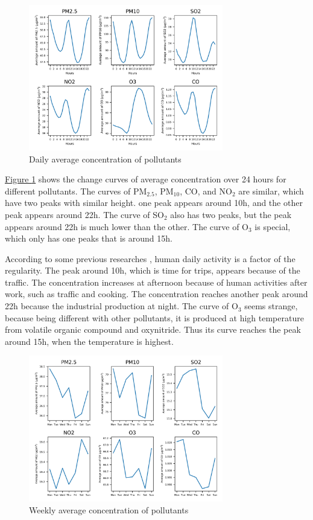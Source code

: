 \documentclass[letterpaper]{article}
\begin{document}
\begin{CJK*}{UTF8}{gkai}
\begin{figure}[h]
  \includegraphics[width = 8.5cm]{dailyavg_pltn.png}
  \caption{Daily average concentration of pollutants}
  \label{figure:2}
\end{figure}

\hyperref[figure:2]{Figure \ref*{figure:2}} shows the change curves of average concentration over 24 hours for different pollutants. The curves of PM$_{2.5}$, PM$_{10}$, CO, and NO$_{2}$ are similar, which have two peaks with similar height. one peak appears around 10h, and the other peak appears around 22h. The curve of SO$_{2}$ also has two peaks, but the peak appears around 22h is much lower than the other. The curve of O$_{3}$ is special, which only has one peaks that is around 15h.

According to some previous researches , human daily activity is a factor of the regularity. The peak around 10h, which is time for trips, appears because of the traffic. The concentration increases at afternoon because of human activities after work, such as traffic and cooking. The concentration reaches another peak around 22h because the industrial production at night. The curve of O$_{3}$ seems strange, because being different with other pollutants, it is produced at high temperature from volatile organic compound and oxynitride. Thus its curve reaches the peak around 15h, when the temperature is highest.

\begin{figure}[h]
  \includegraphics[width = 8.5cm]{weekavg_pltn.png}
  \caption{Weekly average concentration of pollutants}
  \label{figure:3}
\end{figure}


\end{CJK*}
\end{document}
